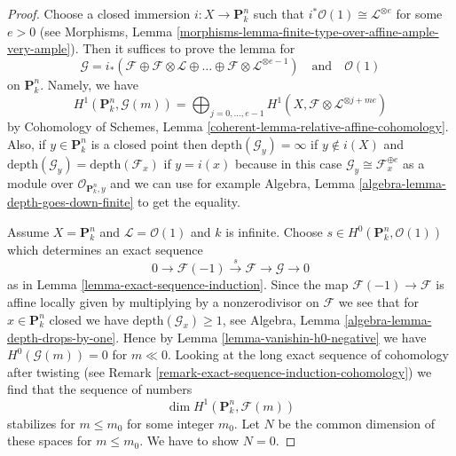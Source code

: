 \begin{proof}
Choose a closed immersion $i : X \to \mathbf{P}^n_k$ such that
$i^*\mathcal{O}(1) \cong \mathcal{L}^{\otimes e}$ for some $e > 0$
(see Morphisms, Lemma
\ref{morphisms-lemma-finite-type-over-affine-ample-very-ample}).
Then it suffices to prove the lemma for
$$
\mathcal{G} =
i_*(\mathcal{F} \oplus \mathcal{F} \otimes \mathcal{L} \oplus \ldots
\oplus \mathcal{F} \otimes \mathcal{L}^{\otimes e - 1})
\quad\text{and}\quad \mathcal{O}(1)
$$
on $\mathbf{P}^n_k$. Namely, we have
$$
H^1(\mathbf{P}^n_k, \mathcal{G}(m)) =
\bigoplus\nolimits_{j = 0, \ldots, e - 1}
H^1(X, \mathcal{F} \otimes \mathcal{L}^{\otimes j + me})
$$
by
Cohomology of Schemes, Lemma \ref{coherent-lemma-relative-affine-cohomology}.
Also, if $y \in \mathbf{P}^n_k$ is a closed point then
$\text{depth}(\mathcal{G}_y) = \infty$ if $y \not \in i(X)$
and $\text{depth}(\mathcal{G}_y) = \text{depth}(\mathcal{F}_x)$
if $y = i(x)$ because in this case
$\mathcal{G}_y \cong \mathcal{F}_x^{\oplus e}$ as a module over
$\mathcal{O}_{\mathbf{P}^n_k, y}$ and we can use for example
Algebra, Lemma \ref{algebra-lemma-depth-goes-down-finite}
to get the equality.

\medskip\noindent
Assume $X = \mathbf{P}^n_k$ and $\mathcal{L} = \mathcal{O}(1)$ and
$k$ is infinite. Choose $s \in H^0(\mathbf{P}^n_k, \mathcal{O}(1))$
which determines an exact sequence
$$
0 \to \mathcal{F}(-1) \xrightarrow{s} \mathcal{F} \to \mathcal{G} \to 0
$$
as in Lemma \ref{lemma-exact-sequence-induction}. Since the map
$\mathcal{F}(-1) \to \mathcal{F}$ is affine locally given by
multiplying by a nonzerodivisor on $\mathcal{F}$
we see that for $x \in \mathbf{P}^n_k$ closed we have
$\text{depth}(\mathcal{G}_x) \geq 1$, see
Algebra, Lemma \ref{algebra-lemma-depth-drops-by-one}.
Hence by Lemma \ref{lemma-vanishin-h0-negative}
we have $H^0(\mathcal{G}(m)) = 0$ for $m \ll 0$.
Looking at the long exact sequence of cohomology after twisting
(see Remark \ref{remark-exact-sequence-induction-cohomology})
we find that the sequence of numbers
$$
\dim H^1(\mathbf{P}^n_k, \mathcal{F}(m))
$$
stabilizes for $m \leq m_0$ for some integer $m_0$.
Let $N$ be the common dimension of these
spaces for $m \leq m_0$. We have to show $N = 0$.


\end{proof}
